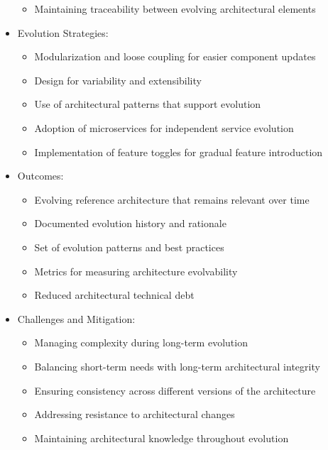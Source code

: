 \documentclass[12pt,a4paper]{article}
\begin{document}
\begin{itemize}
\begin{itemize}
        \item Maintaining traceability between evolving architectural elements \citep{Cleland-Huang2012}
    \end{itemize}
    \item Evolution Strategies:
    \begin{itemize}
        \item Modularization and loose coupling for easier component updates \citep{Baldwin2000}
        \item Design for variability and extensibility \citep{Galster2014}
        \item Use of architectural patterns that support evolution \citep{Buschmann2007}
        \item Adoption of microservices for independent service evolution \citep{Newman2015}
        \item Implementation of feature toggles for gradual feature introduction \citep{Hodgson2017}
    \end{itemize}
    \item Outcomes:
    \begin{itemize}
        \item Evolving reference architecture that remains relevant over time
        \item Documented evolution history and rationale
        \item Set of evolution patterns and best practices
        \item Metrics for measuring architecture evolvability
        \item Reduced architectural technical debt
    \end{itemize}
    \item Challenges and Mitigation:
    \begin{itemize}
        \item Managing complexity during long-term evolution \citep{Kruchten2006}
        \item Balancing short-term needs with long-term architectural integrity \citep{Bosch2004}
        \item Ensuring consistency across different versions of the architecture \citep{Garlan2009}
        \item Addressing resistance to architectural changes \citep{Zimmermann2015}
        \item Maintaining architectural knowledge throughout evolution \citep{Farenhorst2007}
    \end{itemize}
\end{itemize}
\end{document}
